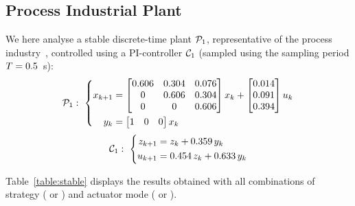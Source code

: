 \subsection{Process Industrial Plant}\label{sec:eval:stable}
We here analyse a stable discrete-time plant $\mathcal{P}_1$, representative of the process industry~\cite{Hagglund:2002}, controlled using a PI-controller $\mathcal{C}_1$ (sampled using the sampling period $T = 0.5$~s):
\begin{equation*}
    \mathcal{P}_1: \,\, \left\{
    \begin{aligned}
        x_{k+1} &= \begin{bmatrix}
            0.606 & 0.304 & 0.076 \\
            0 & 0.606 & 0.304 \\
            0 & 0 & 0.606 \\
        \end{bmatrix} x_k + \begin{bmatrix}
            0.014 \\
            0.091 \\
            0.394 \\
        \end{bmatrix} u_k \\
        y_k &= \begin{bmatrix}
            1 & 0 & 0
        \end{bmatrix} x_k
    \end{aligned} \right.
\end{equation*}
\begin{equation*}
    \mathcal{C}_1: \,\, \left\{
    \begin{aligned}
        z_{k+1} &= z_k + 0.359\, y_k \\
        u_{k+1} &= 0.454\, z_k + 0.633\, y_k
    \end{aligned} \right.
\end{equation*}

\afterpage{
    \clearpage
    \begin{landscape}
        
    \end{landscape}
    \clearpage
}
\afterpage{
    \clearpage
    \begin{landscape}
        
    \end{landscape}
    \clearpage
}

Table~\ref{table:stable} displays the results obtained with all combinations of strategy (\tK{} or \tS{}) and actuator mode (\tZ{} or \tH{}).

